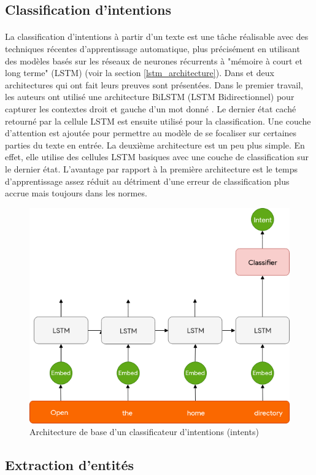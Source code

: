 \subsection{Classification d'intentions}
\paragraph{}
La classification d'intentions à partir d'un texte est une tâche réalisable avec des techniques récentes d'apprentissage automatique, plus précisément en utilisant des modèles basés sur les réseaux de neurones récurrents à "mémoire à court et long terme" (LSTM) (voir la section \ref{lstm_architecture}). Dans \citep{intent_classification} et \citep{intent_slots} deux architectures qui ont fait leurs preuves sont présentées. Dans le premier travail, les auteurs ont utilisé une architecture BiLSTM (LSTM Bidirectionnel) pour capturer les contextes droit et gauche d'un mot donné \citep{blstm}. Le dernier état caché retourné par la cellule LSTM est ensuite utilisé pour la classification. Une couche d'attention est ajoutée \citep{attention_mechanism} pour permettre au modèle de se focaliser sur certaines parties du texte en entrée. La deuxième architecture est un peu plus simple. En effet, elle utilise des cellules LSTM basiques avec une couche de classification sur le dernier état. L'avantage par rapport à la première architecture est le temps d'apprentissage assez réduit au détriment d'une erreur de classification plus accrue mais toujours dans les normes.
\begin{figure}[H]
	\centering
	\label{LSTM_intent}
	\includegraphics[width=0.65\linewidth]{images/NLU/intent_classification.png}
	\caption{Architecture de base d'un classificateur d'intentions (intents) \citep{intent_classification}}
\end{figure}
\subsection{Extraction d'entités}
